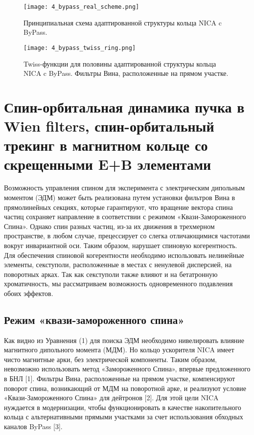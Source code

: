 \begin{figure}[!h]
  \centering
   \texttt{[image: 4\_bypass\_real\_scheme.png]}
   \caption{Принципиальная схема адаптированной структуры кольца NICA c ByPass.}
   \label{fig:4_bypass_real_scheme}
\end{figure}

\begin{figure}[!h]
  \centering
   \texttt{[image: 4\_bypass\_twiss\_ring.png]}
   \caption{Twiss-функции для половины адаптированной структуры кольца NICA c ByPass. Фильтры Вина, расположенные на прямом участке.}
   \label{fig:4_bypass_twiss_ring}
\end{figure}

\newpage
\section{Спин-орбитальная динамика пучка в Wien filters, спин-орбитальный трекинг в магнитном кольце со скрещенными E+B элементами}\label{sec:EDM/Wien_filter_tracking}

\par Возможность управления спином для эксперимента с электрическим дипольным моментом (ЭДМ) может быть реализована путем установки фильтров Вина в прямолинейных секциях, которые гарантируют, что вращение вектора спина частиц сохраняет направление в соответствии с режимом «Квази-Замороженного Спина». Однако спин разных частиц, из-за их движения в трехмерном пространстве, в любом случае, прецессирует со слегка отличающимися частотами вокруг инвариантной оси. Таким образом, нарушает спиновую когерентность. Для обеспечения спиновой когерентности необходимо использовать нелинейные элементы, секступоли, расположенные в местах с ненулевой дисперсией, на поворотных арках. Так как секступоли также влияют и на бетатронную хроматичность, мы рассматриваем возможность одновременного подавления обоих эффектов.

\subsection{Режим «квази-замороженного спина»}\label{sec:EDM/Wien_filter_tracking/QFS}

\par Как видно из Уравнения (1) для поиска ЭДМ необходимо нивелировать влияние магнитного дипольного момента (МДМ). Но кольцо ускорителя NICA имеет чисто магнитные арки, без электрической компоненты. Таким образом, невозможно использовать метод «Замороженного Спина», впервые предложенного в БНЛ [1]. Фильтры Вина, расположенные на прямом участке, компенсируют поворот спина, возникающий от МДМ на поворотной арке, и реализуют условие «Квази-Замороженного Спина» для дейтронов [2]. Для этой цели NICA нуждается в модернизации, чтобы функционировать в качестве накопительного кольца с альтернативными прямыми участками за счет использования обходных каналов ByPass [3].

